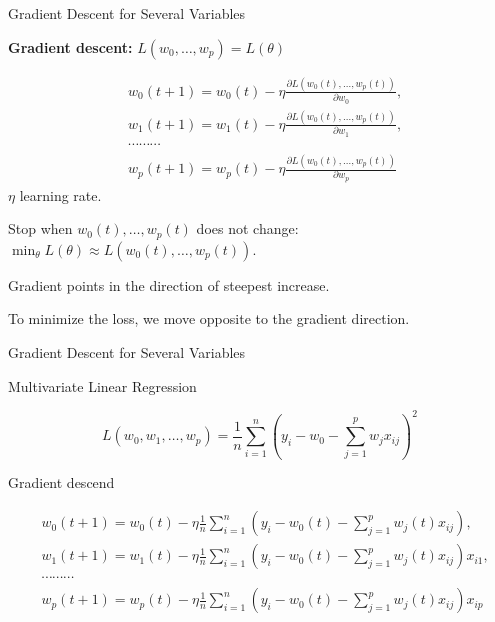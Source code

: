 \documentclass{beamer}
\begin{document}
\begin{frame}{Gradient Descent for Several Variables}

    \textbf{Gradient descent:}
$L(w_0,\ldots, w_p)=L(\theta)$

\[
\begin{split}
& w_0(t+1) = w_0(t) - \eta \frac{\partial L(w_0(t), \ldots, w_p(t))}{\partial w_0}, \\
& w_1(t+1) = w_1(t) - \eta \frac{\partial L(w_0(t), \ldots, w_p(t))}{\partial w_1}, \\
& \cdots \cdots \cdots  \\
& w_p(t+1) = w_p(t) - \eta \frac{\partial L(w_0(t), \ldots, w_p(t))}{\partial w_p}
\end{split}
\]
$\eta$ learning rate. 

\medskip

Stop when $w_0(t),\ldots, w_p(t)$ does not change:
\( \min_{\theta} L(\theta) \approx L(w_0(t), \ldots, w_p    (t)) \).

\medskip 

Gradient points in the direction of steepest increase.

\medskip

To minimize the loss, we move opposite to the gradient direction.


\end{frame}
\begin{frame}{Gradient Descent for Several Variables}

    Multivariate Linear Regression

 \[
   L(w_0, w_1, \ldots, w_p)=\frac{1}{n} \sum_{i=1}^n \left(y_i - w_0 - \sum_{j=1}^p w_j x_{ij}\right)^2
 \]

 Gradient descend

 \[
\begin{split}
& w_0(t+1) = w_0(t) - \eta \frac{1}{n} \sum_{i=1}^n  \left(y_i - w_0(t) - \sum_{j=1}^p w_j(t) x_{ij}\right), \\
& w_1(t+1) = w_1(t) - \eta \frac{1}{n} \sum_{i=1}^n  \left(y_i - w_0(t) - \sum_{j=1}^p w_j(t) x_{ij}\right) x_{i1}, \\
& \cdots \cdots \cdots  \\
& w_p(t+1) = w_p(t) - \eta \frac{1}{n} \sum_{i=1}^n  \left(y_i - w_0(t) - \sum_{j=1}^p w_j(t) x_{ij}\right) x_{ip}
\end{split}
\]

\end{frame}

\end{document}
